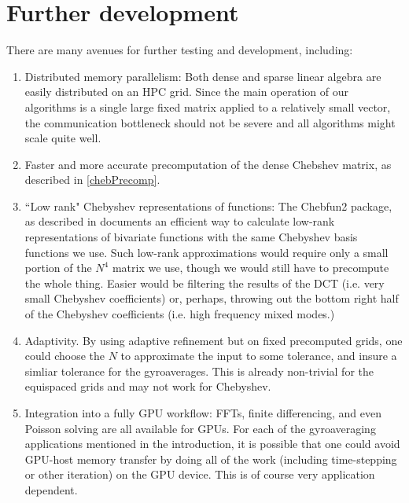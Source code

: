 \section{Further development}
There are many avenues for further testing and development, including:
\begin{enumerate}
	\item Distributed memory parallelism:  Both dense and sparse linear algebra are easily distributed on an HPC grid.  Since the main operation of our algorithms is a single large fixed matrix applied to a relatively small vector, the communication bottleneck should not be severe and all algorithms might scale quite well.
	\item Faster and more accurate precomputation of the dense Chebshev matrix, as described in \ref{chebPrecomp}.
	\item ``Low rank" Chebyshev representations of functions:  The Chebfun2 package, as described in \cite{chebfun2} documents an efficient way to calculate low-rank representations of bivariate functions with the same Chebyshev basis functions we use.  Such low-rank approximations would require only a small portion of the $N^4$ matrix we use, though we would still have to precompute the whole thing.  Easier would be filtering the results of the DCT (i.e. very small Chebyshev coefficients) or, perhaps, throwing out the bottom right half of the Chebyshev coefficients (i.e. high frequency mixed modes.)
	\item Adaptivity.  By using adaptive refinement but on fixed precomputed grids, one could choose the $N$ to approximate the input to some tolerance, and insure a simliar tolerance for the gyroaverages.  This is already non-trivial for the equispaced grids and may not work for Chebyshev.
	\item Integration into a fully GPU workflow: FFTs, finite differencing, and even Poisson solving are all available for GPUs.  For each of the gyroaveraging applications mentioned in the introduction, it is possible that one could avoid GPU-host memory transfer by doing all of the work (including time-stepping or other iteration) on the GPU device.  This is of course very application dependent.
\end{enumerate}

